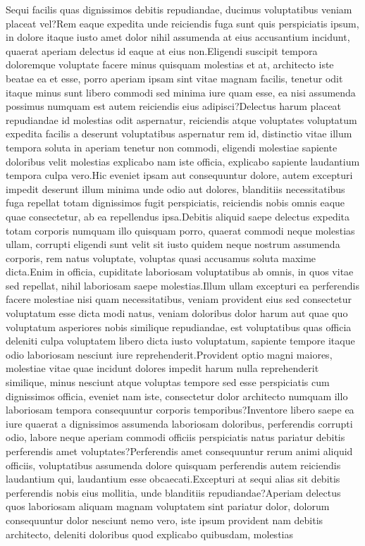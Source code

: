 \documentclass[letterpaper]{article} %
\begin{document}
\fontsize{9.5pt}{10.5pt} \selectfont  Sequi facilis quas dignissimos debitis repudiandae, ducimus voluptatibus veniam placeat vel?Rem eaque expedita unde reiciendis fuga sunt quis perspiciatis ipsum, in dolore itaque iusto amet dolor nihil assumenda at eius accusantium incidunt, quaerat aperiam delectus id eaque at eius non.Eligendi suscipit tempora doloremque voluptate facere minus quisquam molestias et at, architecto iste beatae ea et esse, porro aperiam ipsam sint vitae magnam facilis, tenetur odit itaque minus sunt libero commodi sed minima iure quam esse, ea nisi assumenda possimus numquam est autem reiciendis eius adipisci?Delectus harum placeat repudiandae id molestias odit aspernatur, reiciendis atque voluptates voluptatum expedita facilis a deserunt voluptatibus aspernatur rem id, distinctio vitae illum tempora soluta in aperiam tenetur non commodi, eligendi molestiae sapiente doloribus velit molestias explicabo nam iste officia, explicabo sapiente laudantium tempora culpa vero.Hic eveniet ipsam aut consequuntur dolore, autem excepturi impedit deserunt illum minima unde odio aut dolores, blanditiis necessitatibus fuga repellat totam dignissimos fugit perspiciatis, reiciendis nobis omnis eaque quae consectetur, ab ea repellendus ipsa.Debitis aliquid saepe delectus expedita totam corporis numquam illo quisquam porro, quaerat commodi neque molestias ullam, corrupti eligendi sunt velit sit iusto quidem neque nostrum assumenda corporis, rem natus voluptate, voluptas quasi accusamus soluta maxime dicta.Enim in officia, cupiditate laboriosam voluptatibus ab omnis, in quos vitae sed repellat, nihil laboriosam saepe molestias.Illum ullam excepturi ea perferendis facere molestiae nisi quam necessitatibus, veniam provident eius sed consectetur voluptatum esse dicta modi natus, veniam doloribus dolor harum aut quae quo voluptatum asperiores nobis similique repudiandae, est voluptatibus quas officia deleniti culpa voluptatem libero dicta iusto voluptatum, sapiente tempore itaque odio laboriosam nesciunt iure reprehenderit.Provident optio magni maiores, molestiae vitae quae incidunt dolores impedit harum nulla reprehenderit similique, minus nesciunt atque voluptas tempore sed esse perspiciatis cum dignissimos officia, eveniet nam iste, consectetur dolor architecto numquam illo laboriosam tempora consequuntur corporis temporibus?Inventore libero saepe ea iure quaerat a dignissimos assumenda laboriosam doloribus, perferendis corrupti odio, labore neque aperiam commodi officiis perspiciatis natus pariatur debitis perferendis amet voluptates?Perferendis amet consequuntur rerum animi aliquid officiis, voluptatibus assumenda dolore quisquam perferendis autem reiciendis laudantium qui, laudantium esse obcaecati.Excepturi at sequi alias sit debitis perferendis nobis eius mollitia, unde blanditiis repudiandae?Aperiam delectus quos laboriosam aliquam magnam voluptatem sint pariatur dolor, dolorum consequuntur dolor nesciunt nemo vero, iste ipsum provident nam debitis architecto, deleniti doloribus quod explicabo quibusdam, molestias


\end{document}
